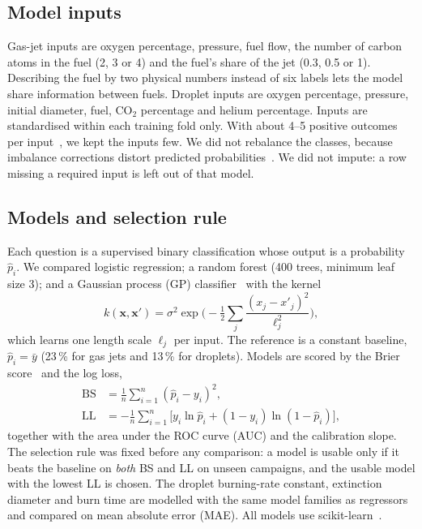 \documentclass[11pt,twocolumn]{article}
\newcommand{\COtwo}{\ensuremath{\mathrm{CO_2}}}
\newcommand{\pct}{\,\%}
\begin{document}
\subsection{Model inputs}

Gas-jet inputs are oxygen percentage, pressure, fuel flow, the number of carbon atoms in the fuel (2, 3 or 4)
and the fuel's share of the jet (0.3, 0.5 or 1). Describing the fuel by two physical numbers instead of six
labels lets the model share information between fuels. Droplet inputs are oxygen percentage, pressure,
initial diameter, fuel, \COtwo{} percentage and helium percentage. Inputs are standardised within each
training fold only. With about 4--5 positive outcomes per input~\cite{riley2019}, we kept the inputs few.
We did not rebalance the classes, because imbalance corrections distort predicted
probabilities~\cite{goorbergh2022}. We did not impute: a row missing a required input is left out of that
model.

\subsection{Models and selection rule}

Each question is a supervised binary classification whose output is a probability $\hat p_i$. We compared
logistic regression; a random forest (400 trees, minimum leaf size 3); and a Gaussian process (GP)
classifier~\cite{rasmussen2006} with the kernel
\begin{equation}
k(\mathbf{x}, \mathbf{x}') = \sigma^2 \exp\!\Big(-\tfrac{1}{2}\sum_{j} \frac{(x_j - x'_j)^2}{\ell_j^2}\Big),
\end{equation}
which learns one length scale $\ell_j$ per input. The reference is a constant baseline,
$\hat p_i = \bar y$ (23\pct{} for gas jets and 13\pct{} for droplets). Models are scored by the Brier
score~\cite{brier1950} and the log loss,
\begin{align}
\mathrm{BS} &= \frac{1}{n}\sum_{i=1}^{n} (\hat p_i - y_i)^2, \\
\mathrm{LL} &= -\frac{1}{n}\sum_{i=1}^{n} \big[y_i \ln \hat p_i + (1-y_i)\ln(1-\hat p_i)\big],
\end{align}
together with the area under the ROC curve (AUC) and the calibration slope. The selection rule was fixed
before any comparison: a model is usable only if it beats the baseline on \emph{both} BS and LL on unseen
campaigns, and the usable model with the lowest LL is chosen. The droplet burning-rate constant, extinction
diameter and burn time are modelled with the same model families as regressors and compared on mean
absolute error (MAE). All models use scikit-learn~\cite{pedregosa2011}.
\end{document}
